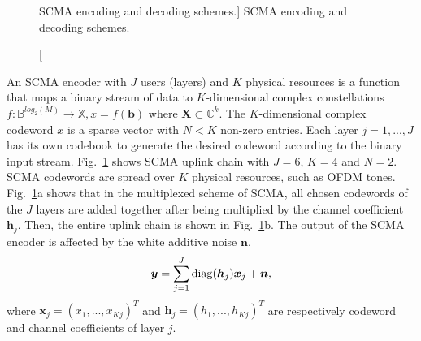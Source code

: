 \begin{figure}[htp]
{
  }
  \caption
    [SCMA encoding and decoding schemes.]
    {SCMA encoding and decoding schemes.}
  \label{fig:scma_codec}
\end{figure}

An SCMA encoder with $J$ users (layers) and $K$ physical resources is a function
that maps a binary stream of data to $K$-dimensional complex constellations
$f : \mathbb{B}^{log_{2}(M)} \rightarrow \mathbb{X}, x = f(\bm{b})$ where
$\bm{X} \subset \mathbb{C}^k$. The $K$-dimensional complex codeword $x$ is a
sparse vector with $N < K$ non-zero entries. Each layer $j=1, ..., J$ has its
own codebook to generate the desired codeword according to the binary input
stream. Fig.~\ref{fig:scma_codec} shows SCMA uplink chain with $J = 6$, $K = 4$
and $N = 2$. SCMA codewords are spread over $K$ physical resources, such as
OFDM tones. Fig.~\ref{fig:scma_codec}a shows that in the multiplexed scheme of
SCMA, all chosen codewords of the $J$ layers are added together after being
multiplied by the channel coefficient $\bm{h}_j$. Then, the entire uplink chain
is shown in Fig.~\ref{fig:scma_codec}b. The output of the SCMA encoder is
affected by the white additive noise $\bm{n}$.
\begin{equation}
  \label{eq:scma_1}
  \bm{y} = \sum\limits_{j=1}^J \operatorname{diag}(\bm{h}_j)\bm{x}_j+\bm{n},
\end{equation}
where $\bm{x}_j=(x_1,...,x_{Kj})^T$ and $\bm{h}_j=(h_1,...,h_{Kj})^T$ are
respectively codeword and channel coefficients of layer $j$.

